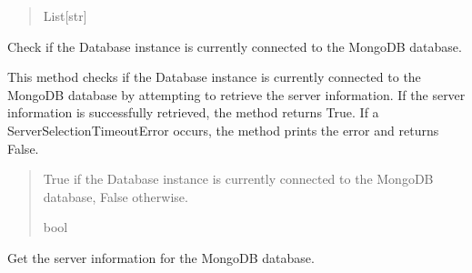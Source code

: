 \documentclass[letterpaper,10pt,english]{sphinxmanual}
\begin{document}
\begin{fulllineitems}
\begin{fulllineitems}
\begin{quote}
\begin{description}
\sphinxAtStartPar
List{[}str{]}

\end{description}\end{quote}

\end{fulllineitems}


\begin{fulllineitems}
\label{\detokenize{forensicfit.database.database:forensicfit.database.database.Database.connected}}
\pysigstartsignatures
{}
\pysigstopsignatures
\sphinxAtStartPar
Check if the Database instance is currently connected to the MongoDB database.

\sphinxAtStartPar
This method checks if the Database instance is currently connected to the MongoDB database
by attempting to retrieve the server information. If the server information is successfully
retrieved, the method returns True. If a ServerSelectionTimeoutError occurs, the method
prints the error and returns False.
\begin{quote}\begin{description}
\sphinxAtStartPar
True if the Database instance is currently connected to the MongoDB database, False otherwise.

\sphinxAtStartPar
bool

\end{description}\end{quote}

\end{fulllineitems}


\begin{fulllineitems}
\label{\detokenize{forensicfit.database.database:forensicfit.database.database.Database.server_info}}
\pysigstartsignatures
{}
\pysigstopsignatures
\sphinxAtStartPar
Get the server information for the MongoDB database.


\end{fulllineitems}
\end{fulllineitems}
\end{document}
